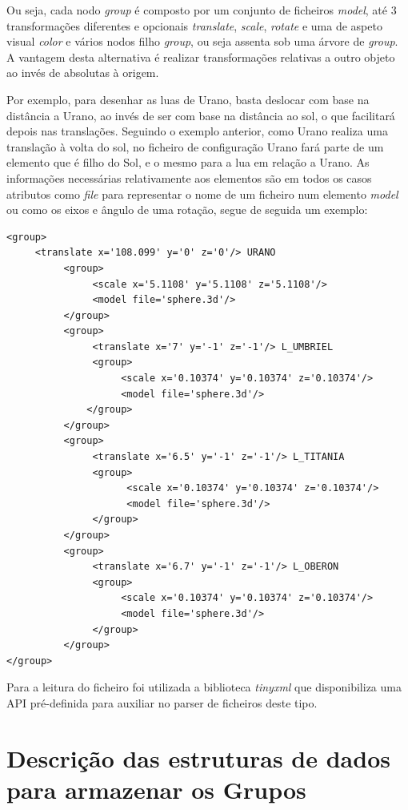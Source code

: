 Ou seja, cada nodo \textit{group} é composto por um conjunto de ficheiros \textit{model}, até 3 transformações diferentes e opcionais \textit{translate}, \textit{scale}, \textit{rotate} e uma de aspeto visual \textit{color} e vários nodos filho \textit{group}, ou seja assenta sob uma árvore de \textit{group}.  A vantagem desta alternativa é realizar transformações relativas a outro objeto ao invés de absolutas à origem. 

Por exemplo, para desenhar as luas de Urano, basta deslocar com base na distância a Urano, ao invés de ser com base na distância ao sol, o que facilitará depois nas translações. Seguindo o exemplo anterior, como Urano realiza uma translação à volta do sol, no ficheiro de configuração Urano fará parte de um elemento que é filho do Sol, e o mesmo para a lua em relação a Urano. As informações necessárias relativamente aos elementos são em todos os casos atributos como \textit{file} para representar o nome de um ficheiro num elemento \textit{model} ou como os eixos e ângulo de uma rotação, segue de seguida um exemplo: 

\begin{Verbatim}
<group>
     <translate x='108.099' y='0' z='0'/> URANO
          <group>
               <scale x='5.1108' y='5.1108' z='5.1108'/>
               <model file='sphere.3d'/>
          </group>
          <group>
               <translate x='7' y='-1' z='-1'/> L_UMBRIEL
               <group>
                    <scale x='0.10374' y='0.10374' z='0.10374'/>
                    <model file='sphere.3d'/>
              </group>
          </group>
          <group>
               <translate x='6.5' y='-1' z='-1'/> L_TITANIA
               <group>
                     <scale x='0.10374' y='0.10374' z='0.10374'/>
                     <model file='sphere.3d'/>
               </group>
          </group>
          <group>
               <translate x='6.7' y='-1' z='-1'/> L_OBERON
               <group>
                    <scale x='0.10374' y='0.10374' z='0.10374'/>
                    <model file='sphere.3d'/>
               </group>
          </group>
</group>
\end{Verbatim}

Para a leitura do ficheiro foi utilizada a biblioteca \textit{tinyxml} que disponibiliza uma API pré-definida para auxiliar no parser de ficheiros deste tipo.  


\section{ Descrição das estruturas de dados para armazenar os Grupos}

